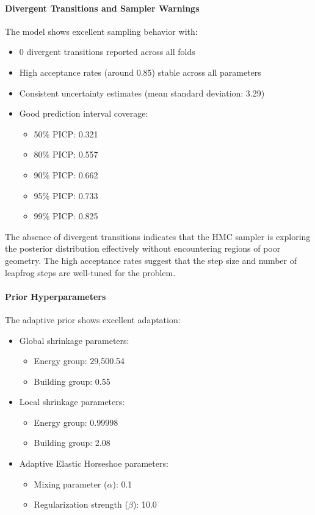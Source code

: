 \paragraph{Divergent Transitions and Sampler Warnings}
The model shows excellent sampling behavior with:
\begin{itemize}
    \item 0 divergent transitions reported across all folds
    \item High acceptance rates (around 0.85) stable across all parameters
    \item Consistent uncertainty estimates (mean standard deviation: 3.29)
    \item Good prediction interval coverage:
    \begin{itemize}
        \item 50\% PICP: 0.321
        \item 80\% PICP: 0.557
        \item 90\% PICP: 0.662
        \item 95\% PICP: 0.733
        \item 99\% PICP: 0.825
    \end{itemize}
\end{itemize}

The absence of divergent transitions indicates that the HMC sampler is exploring the posterior distribution effectively without encountering regions of poor geometry. The high acceptance rates suggest that the step size and number of leapfrog steps are well-tuned for the problem.

\paragraph{Prior Hyperparameters}
The adaptive prior shows excellent adaptation:
\begin{itemize}
    \item Global shrinkage parameters:
    \begin{itemize}
        \item Energy group: 29,500.54
        \item Building group: 0.55
    \end{itemize}
    \item Local shrinkage parameters:
    \begin{itemize}
        \item Energy group: 0.99998
        \item Building group: 2.08
    \end{itemize}
    \item Adaptive Elastic Horseshoe parameters:
    \begin{itemize}
        \item Mixing parameter ($\alpha$): 0.1
        \item Regularization strength ($\beta$): 10.0
    \end{itemize}
\end{itemize}

